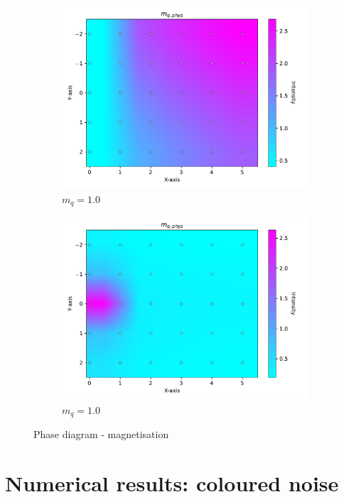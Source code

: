 \begin{figure}
    \begin{subfigure}[b]{0.48\textwidth}
        \includegraphics[width=\textwidth]{figures/phase_diagram/m_g_mq.pdf}
        \caption{$m_q = 1.0$}
    \end{subfigure}
    \begin{subfigure}[b]{0.48\textwidth}
        \includegraphics[width=\textwidth]{figures/phase_diagram/m_g_chi2.pdf}
        \caption{$m_q = 1.0$}
    \end{subfigure}
    \caption{Phase diagram - magnetisation}
    \label{fig:phase_diagram_phi}
\end{figure}

\chapter{Numerical results: coloured noise}
\label{chapt:results_coloured}

